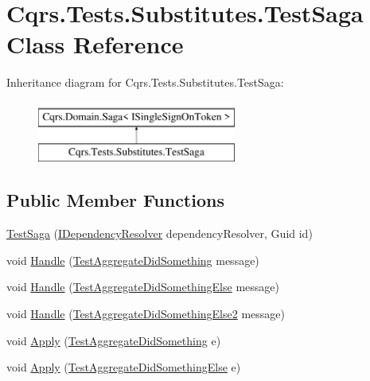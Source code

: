 \hypertarget{classCqrs_1_1Tests_1_1Substitutes_1_1TestSaga}{}\section{Cqrs.\+Tests.\+Substitutes.\+Test\+Saga Class Reference}
\label{classCqrs_1_1Tests_1_1Substitutes_1_1TestSaga}
Inheritance diagram for Cqrs.\+Tests.\+Substitutes.\+Test\+Saga\+:\begin{figure}[H]
\begin{center}
\leavevmode
\includegraphics[height=2.000000cm]{classCqrs_1_1Tests_1_1Substitutes_1_1TestSaga}
\end{center}
\end{figure}
\subsection*{Public Member Functions}
\begin{DoxyCompactItemize}
\item 
\hyperlink{classCqrs_1_1Tests_1_1Substitutes_1_1TestSaga_add3c932a45b03e651a09bc0df79fa267_add3c932a45b03e651a09bc0df79fa267}{Test\+Saga} (\hyperlink{interfaceCqrs_1_1Configuration_1_1IDependencyResolver}{I\+Dependency\+Resolver} dependency\+Resolver, Guid id)
\item 
void \hyperlink{classCqrs_1_1Tests_1_1Substitutes_1_1TestSaga_a7ee08daccfa798c17e08ceaf4d06e65d_a7ee08daccfa798c17e08ceaf4d06e65d}{Handle} (\hyperlink{classCqrs_1_1Tests_1_1Substitutes_1_1TestAggregateDidSomething}{Test\+Aggregate\+Did\+Something} message)
\item 
void \hyperlink{classCqrs_1_1Tests_1_1Substitutes_1_1TestSaga_a25e222765c57e5dad8af26dfbeed9531_a25e222765c57e5dad8af26dfbeed9531}{Handle} (\hyperlink{classCqrs_1_1Tests_1_1Substitutes_1_1TestAggregateDidSomethingElse}{Test\+Aggregate\+Did\+Something\+Else} message)
\item 
void \hyperlink{classCqrs_1_1Tests_1_1Substitutes_1_1TestSaga_a5dd814be4b049bafa2e2b516a34e7045_a5dd814be4b049bafa2e2b516a34e7045}{Handle} (\hyperlink{classCqrs_1_1Tests_1_1Substitutes_1_1TestAggregateDidSomethingElse2}{Test\+Aggregate\+Did\+Something\+Else2} message)
\item 
void \hyperlink{classCqrs_1_1Tests_1_1Substitutes_1_1TestSaga_a869b24d355dca9bd4e3ddbd7ed4a8834_a869b24d355dca9bd4e3ddbd7ed4a8834}{Apply} (\hyperlink{classCqrs_1_1Tests_1_1Substitutes_1_1TestAggregateDidSomething}{Test\+Aggregate\+Did\+Something} e)
\item 
void \hyperlink{classCqrs_1_1Tests_1_1Substitutes_1_1TestSaga_ac2999d7210bdf7624e91aa81238f347e_ac2999d7210bdf7624e91aa81238f347e}{Apply} (\hyperlink{classCqrs_1_1Tests_1_1Substitutes_1_1TestAggregateDidSomethingElse}{Test\+Aggregate\+Did\+Something\+Else} e)
\end{DoxyCompactItemize}
